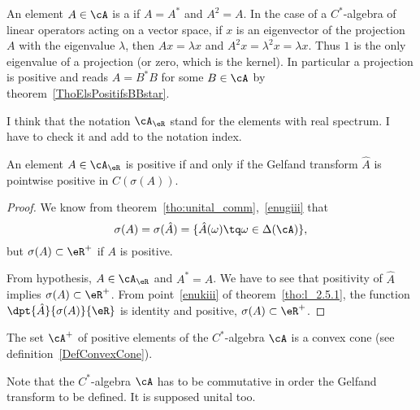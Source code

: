 An element $A\in\cA$ is a  if $A=A^*$ and $A^2=A$. In the case of a $C^*$-algebra of linear operators acting on a vector space, if $x$ is an eigenvector of the projection $A$ with the eigenvalue $\lambda$, then $Ax=\lambda x$ and $A^2x=\lambda^2x=\lambda x$. Thus $1$ is the only eigenvalue of a projection (or zero, which is the kernel). In particular a projection is positive and reads\label{PgProjPositif} $A=B^*B$ for some $B\in \cA$ by theorem~\ref{ThoElsPositifsBBstar}.

\begin{probleme}
	I think that the notation \(\cA_{\eR}\) stand for the elements with real spectrum. I have to check it and add to the notation index.
\end{probleme}

\begin{proposition}
	An element $A\in\cA_{\eR}$ is positive if and only if the Gelfand transform $\hat A$ is pointwise positive in $C(\sigma(A))$.
\end{proposition}

\begin{proof}
	We know from theorem~\ref{tho:unital_comm},~\ref{enugiii} that
	\[
		\sigma(A)=\sigma(\hat A)=\{ \hat A(\omega)\tq\omega\in\Delta(\cA) \},
	\]
	but $\sigma(A)\subset\eR^+$ if $A$ is positive.

	From hypothesis, $A\in\cA_{\eR}$ and $A^*=A$. We have to see that positivity of $\hat A$ implies $\sigma(A)\subset\eR^+$. From point~\ref{enukiii} of theorem~\ref{tho:l_2.5.1}, the function $\dpt{\hat A}{\sigma(A)}{\eR}$ is identity and positive, $\sigma(A)\subset\eR^+$.

\end{proof}


\begin{proposition}     \label{PropAplusConvexCone}
	The set $\cA^+$ of positive elements of the $C^*$-algebra $\cA$ is a convex cone (see definition~\ref{DefConvexCone}).
\end{proposition}

Note that the $C^*$-algebra $\cA$ has to be commutative in order the Gelfand transform to be defined. It is supposed unital too.

